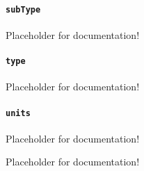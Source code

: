 \paragraph{\texttt{subType}}\mbox{}
\newline\tab Placeholder for documentation!

\paragraph{\texttt{type}}\mbox{}
\newline\tab Placeholder for documentation!

\paragraph{\texttt{units}}\mbox{}
\newline\tab Placeholder for documentation!

Placeholder for documentation!

